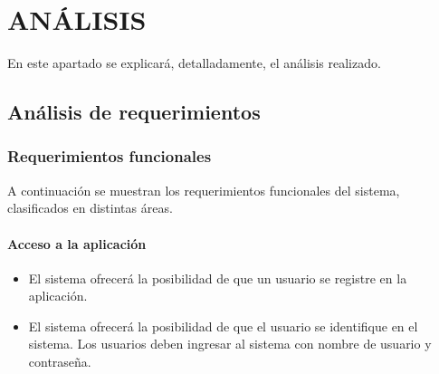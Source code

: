 \chapter[Análisis]{
  \label{chp:analisis}
  ANÁLISIS
}
\thispagestyle{numberingStyle}
\pagestyle{numberingStyle}

En este apartado se explicará, detalladamente, el análisis realizado.

\section{Análisis de requerimientos}

\subsection{Requerimientos funcionales}
A continuación se muestran los requerimientos funcionales del sistema, clasificados en distintas áreas.

\subsubsection*{Acceso a la aplicación}
\begin{itemize}
\setlength\itemsep{1pt}
\item El sistema ofrecerá la posibilidad de que un usuario se registre en la aplicación.
\item El sistema ofrecerá la posibilidad de que el usuario se identifique en el sistema. Los usuarios deben ingresar al sistema con  nombre de usuario y contraseña.
\end{itemize}

